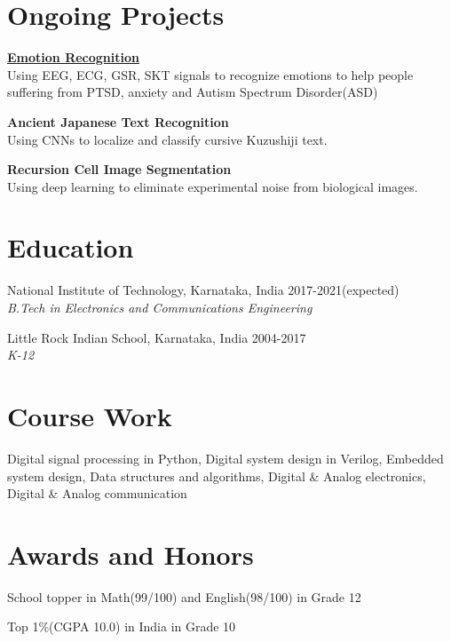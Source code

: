 \documentclass[letterpaper]{article}
\renewenvironment{itemize}{
  \begin{list}{}{
    \setlength{\leftmargin}{1.5em}
  }
}{
  \end{list}
}
\begin{document}
\section*{Ongoing Projects}
  \begin{itemize}
    \item
    \href{https://github.com/rshwndsz/emotion-recognition}{\textbf{Emotion Recognition}}\\
    Using EEG, ECG, GSR, SKT signals to recognize emotions to help people suffering from PTSD, anxiety and Autism Spectrum Disorder(ASD)
    \item
    \textbf{Ancient Japanese Text Recognition}\\
    Using CNNs to localize and classify cursive Kuzushiji text.
    \item
    \textbf{Recursion Cell Image Segmentation}\\
    Using deep learning to eliminate experimental noise from biological images.
  \end{itemize}

\section*{Education}
  \begin{itemize}
    \item National Institute of Technology, Karnataka, India\hfill 
    2017-2021(expected)
    \\
    {\sl B.Tech in Electronics and Communications Engineering}

    \item Little Rock Indian School, Karnataka, India\hfill
    2004-2017
    \\
    {\sl K-12}\hfill
  \end{itemize}

\section*{Course Work}
  Digital signal processing in Python, Digital system design in Verilog, Embedded system design, Data structures and algorithms, Digital \& Analog electronics, Digital \& Analog communication

\section*{Awards and Honors}
\begin{itemize}
  \item School topper in Math(99/100) and English(98/100) in Grade 12
  \item Top 1\%(CGPA 10.0) in India in Grade 10
\end{itemize}
\end{document}
